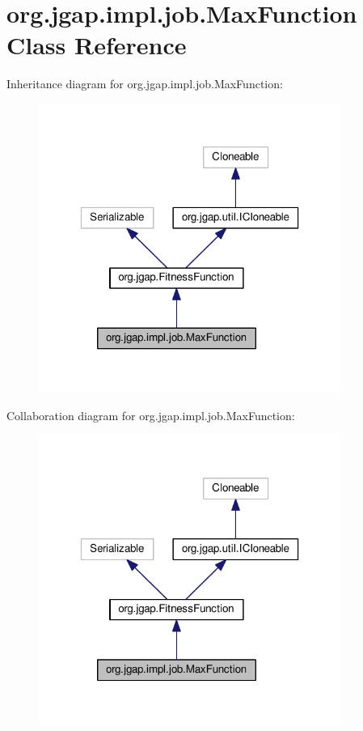 \hypertarget{classorg_1_1jgap_1_1impl_1_1job_1_1_max_function}{\section{org.\-jgap.\-impl.\-job.\-Max\-Function Class Reference}
\label{classorg_1_1jgap_1_1impl_1_1job_1_1_max_function}
}


Inheritance diagram for org.\-jgap.\-impl.\-job.\-Max\-Function\-:
\nopagebreak
\begin{figure}[H]
\begin{center}
\leavevmode
\includegraphics[width=280pt]{classorg_1_1jgap_1_1impl_1_1job_1_1_max_function__inherit__graph}
\end{center}
\end{figure}


Collaboration diagram for org.\-jgap.\-impl.\-job.\-Max\-Function\-:
\nopagebreak
\begin{figure}[H]
\begin{center}
\leavevmode
\includegraphics[width=280pt]{classorg_1_1jgap_1_1impl_1_1job_1_1_max_function__coll__graph}
\end{center}
\end{figure}
